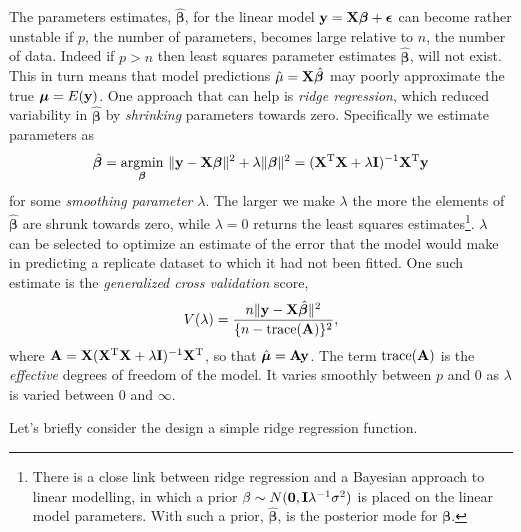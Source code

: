 \documentclass[10pt] {article}
\newcommand{\bp}{{\vm \beta}}
\newcommand{\X}{{\vf X}}
\newcommand{\vf}{\bf} %
\newcommand{\vm}{\bm} %
\newcommand{\ts}{^{\rm T}}
\theoremstyle{definition}
\begin{document}
The parameters estimates, $\hat \bp$, for the linear model ${\bf y} = {\bf X}\bp + {\bm \epsilon}$ can become rather unstable if $p$, the number of parameters, becomes large relative to $n$, the number of data. Indeed if $p>n$ then least squares parameter estimates $\hat \bp $, will not exist. This in turn means that model predictions $\hat \mu = {\bf X} \hat \bp$ may poorly approximate the true ${\bm \mu} = E({\bf y})$. One approach that can help is {\em ridge regression}, which reduced variability in $\hat \bp$ by {\em shrinking} parameters towards zero. Specifically we estimate parameters as 
$$
\hat \bp = \underset{\bp}{\text{argmin}} ~ \|{\bf y} - \X\bp\|^2 + \lambda \|\bp\|^2 = (\X\ts \X + \lambda {\bf I})^{-1} \X\ts {\bf y}
$$
for some {\em smoothing parameter} $\lambda$. The larger we make $\lambda$ the more the elements of  $\hat \bp$ are shrunk towards zero, while $\lambda=0$ returns the least squares estimates\footnote{There is a close link between ridge regression and a Bayesian approach to linear modelling, in which a prior $\beta\sim N({\bf 0}, {\bf I}\lambda^{-1}\sigma^2)$ is placed on the linear model parameters. With such a prior, $\hat \bp$, is the posterior mode for $\bp$.}. $\lambda$ can be selected to optimize an estimate of the error that the model would make in predicting a replicate dataset to which it had not been fitted. One such estimate is the {\em generalized cross validation} score,
$$
V(\lambda) = \frac{n\|{\bf y} - {\bf X}\hat \bp\|^2}{\{n-\text{trace}({\bf A})\}^2},
$$
where ${\bf A} = \X(\X\ts \X + \lambda {\bf I})^{-1} \X\ts$, so that $\hat {\bm \mu} = {\bf Ay}$. The term $\text{trace}({\bf A})$ is the {\em effective} degrees of freedom of the model. It varies smoothly between $p$ and 0 as $\lambda$ is varied between 0 and $\infty$. 

Let's briefly consider the design a simple ridge regression function.
\end{document}
